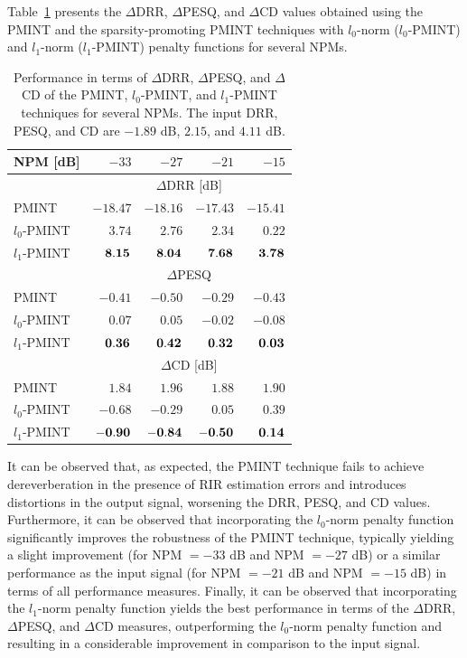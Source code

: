 \documentclass{article}
\begin{document}
Table~\ref{tbl: perf} presents the $\Delta$DRR, $\Delta$PESQ, and $\Delta$CD values obtained using the PMINT and the sparsity-promoting PMINT techniques with $l_0$-norm ($l_0$-PMINT) and $l_1$-norm ($l_1$-PMINT) penalty functions for several NPMs.
\begin{table}[t!]
\begin{center}
  \caption{Performance in terms of $\Delta$DRR, $\Delta$PESQ, and $\Delta$CD of the PMINT, $l_0$-PMINT, and $l_1$-PMINT techniques for several NPMs. The input DRR, PESQ, and CD are $-1.89$ dB, $2.15$, and $4.11$ dB.}
  \label{tbl: perf}
  \begin{tabularx}{\linewidth}{Xrrrr}
    \toprule
    NPM [dB] & $-33$ & $-27$ & $-21$ & $-15$ \\
    \midrule
    & \multicolumn{4}{c}{$\Delta$DRR [dB]} \\
    \midrule
    PMINT & $-18.47$ & $-18.16$ & $-17.43$ & $-15.41$ \\
    $l_0$-PMINT & $3.74$ & $2.76$ & $2.34$ & $0.22$ \\
    $l_1$-PMINT & ${\bf{8.15}}$ & $\bf{8.04}$ & $\bf{7.68}$ & $\bf{3.78}$ \\
    \midrule
    & \multicolumn{4}{c}{$\Delta$PESQ } \\
    \midrule
    PMINT & $-0.41$ & $-0.50$ & $-0.29$ & $-0.43$ \\
    $l_0$-PMINT & $0.07$ & $0.05$ & $-0.02$ & $-0.08$ \\
    $l_1$-PMINT & $\bf{0.36}$ & $\bf{0.42}$ & $\bf{0.32}$ & $\bf{0.03}$ \\
    \midrule
    & \multicolumn{4}{c}{$\Delta$CD [dB] } \\
    \midrule
    PMINT & $1.84$ & $1.96$ & $1.88$ & $1.90$ \\
    $l_0$-PMINT & $-0.68$ & $-0.29$ & $0.05$ & $0.39$ \\
    $l_1$-PMINT & $\bf{-0.90}$ & $\bf{-0.84}$ & $\bf{-0.50}$ & $\bf{0.14}$ \\
    \bottomrule
  \end{tabularx}
\end{center}
\vspace{-0.5cm}
\end{table}
It can be observed that, as expected, the PMINT technique fails to achieve dereverberation in the presence of RIR estimation errors and introduces distortions in the output signal, worsening the DRR, PESQ, and CD values.
Furthermore, it can be observed that incorporating the $l_0$-norm penalty function significantly improves the robustness of the PMINT technique, typically yielding  a slight improvement (for NPM $=-33$ dB and NPM $=-27$ dB) or a similar performance as the input signal (for NPM $=-21$ dB and NPM $=-15$ dB) in terms of all performance measures.
Finally, it can be observed that incorporating the $l_1$-norm penalty function yields the best performance in terms of the $\Delta$DRR, $\Delta$PESQ, and $\Delta$CD measures, outperforming the $l_0$-norm penalty function and resulting in a considerable improvement in comparison to the input signal.
\end{document}
